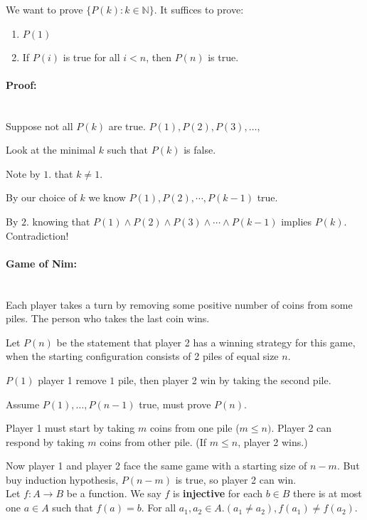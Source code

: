 \documentclass[a4paper, 11pt, twoside]{article}
\begin{document}
We want to prove $\{P(k):k\in\mathbb{N}\}$. It suffices to prove:

\begin{enumerate}
	\item $P(1)$
	\item If $P(i)$ is true for all $i< n$, then $P(n)$ is true.
\end{enumerate}

\paragraph{Proof:}\ \\

Suppose not all $P(k)$ are true. $P(1), P(2), P(3), \dots, $

Look at the minimal $k$ such that $P(k)$ is false.

Note by $1.$ that $k\not=1.$

By our choice of $k$ we know $P(1), P(2), \cdots, P(k-1)$ true.

By $2.$ knowing that $P(1) \wedge P(2) \wedge P(3) \wedge \cdots \wedge P(k-1)$ implies $P(k)$. Contradiction!\\

\paragraph{Game of Nim:}\ \\

Each player takes a turn by removing some positive number of coins from some piles. The person who takes the last coin wins.

Let $P(n)$ be the statement that player 2 has a winning strategy for this game, when the starting configuration consists of 2 piles of equal size $n$.

$P(1)$ player 1 remove $1$ pile, then player 2 win by taking the second pile.

Assume $P(1), \dots, P(n-1)$ true, must prove $P(n)$.

Player 1 must start by taking $m$ coins from one pile ($m\leq n)$. Player 2 can respond by taking $m$ coins from other pile. (If $m\leq n$, player 2 wins.)

Now player 1 and player 2 face the same game with a starting size of $n-m$. But buy induction hypothesis, $P(n-m)$ is true, so player 2 can win.\\

Let $f: A \rightarrow B$ be a function. We say $f$ is \textbf{injective} for each $b\in B$ there is at most one $a\in A$ such that $f(a)=b.$ For all $a_1, a_2 \in A. (a_1\not= a_2), f(a_1)\not= f(a_2).$\\
\end{document}

